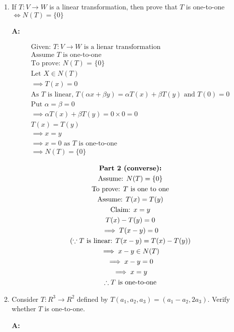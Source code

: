 \documentclass[english,course,fleqn]{lecture}
\newenvironment{qanda}{\begin{enumerate}\setlength{\parindent}{0pt}}{\medskip\end{enumerate}}
\newcommand{\Q}{\bigskip\bfseries \item}
\newcommand{\A}{\par\textbf{A:} \normalfont}
\begin{document}
\begin{qanda}
  
  \Q If $T:V\rightarrow W$ is a linear transformation, then prove that $T$ is one-to-one $\iff N(T) = \{0\}$

  \A

  \begin{gather*}
    \text{Given: } T:V\rightarrow W \text{ is a lienar transformation}\\
    \text{Assume $T$ is one-to-one}\\
    \text{To prove: $N(T)$ = \{0\}}\\
    \text{Let $X\in N(T)$}\\
    \implies T(x) = 0\\
    \text{As $T$ is linear, $T(\alpha x + \beta y) = \alpha T(x) + \beta T(y)$ and $T(0) = 0$}\\
    \text{Put }\alpha = \beta = 0\\
    \implies \alpha T(x) + \beta T(y) = 0 \times 0 = 0\\
    T(x) = T(y)\\
    \implies x = y\\
    \implies x = 0 \text{ as $T$ is one-to-one}\\
    \implies N(T) = \{0\}
  \end{gather*}

  \begin{gather*}
    \text{\textbf{Part 2 (converse):}}\\
    \text{Assume: $N(T) = \{0\}$}\\
    \text{To prove: $T$ is one to one}\\
    \text{Assume: $T(x) = T(y)$}\\
    \text{Claim: $x = y$}\\
    T(x) - T(y) = 0\\
    \implies T(x-y) = 0\\
    (\because T \text{ is linear: } T(x-y) = T(x) - T(y))\\
    \implies x-y \in N(T)\\
    \implies x-y = 0\\
    \implies x = y\\
    \therefore \text{$T$ is one-to-one}
  \end{gather*}


  \Q Consider $T:R^{3} \rightarrow R^{2}$ defined by $T(a_{1}, a_{2}, a_{3}) = (a_{1} - a_{2}, 2 a_{3})$.
  Verify whether $T$ is one-to-one.

  \A 



\end{qanda}
\end{document}
